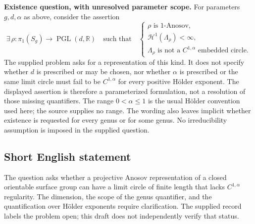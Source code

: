 \documentclass[11pt]{article}
\begin{document}
\textbf{Existence question, with unresolved parameter scope.} For parameters \(g,d,\alpha\) as above, consider the assertion
\[
\exists\,\rho:\pi_1(S_g)\to\operatorname{PGL}(d,\mathbb R)
\quad\text{such that}\quad
\begin{cases}
\rho\text{ is }1\text{-Anosov},\\
\mathcal H^1(\Lambda_\rho)<\infty,\\
\Lambda_\rho\text{ is not a }C^{1,\alpha}\text{ embedded circle}.
\end{cases}
\]
The supplied problem asks for a representation of this kind. It does not specify whether \(d\) is prescribed or may be chosen, nor whether \(\alpha\) is prescribed or the same limit circle must fail to be \(C^{1,\alpha}\) for every positive Hölder exponent. The displayed assertion is therefore a parameterized formulation, not a resolution of those missing quantifiers. The range \(0<\alpha\leq1\) is the usual Hölder convention used here; the source supplies no range. The wording also leaves implicit whether existence is requested for every genus or for some genus. No irreducibility assumption is imposed in the supplied question.
\subsection{Short English statement}
The question asks whether a projective Anosov representation of a closed orientable surface group can have a limit circle of finite length that lacks \(C^{1,\alpha}\) regularity. The dimension, the scope of the genus quantifier, and the quantification over Hölder exponents require clarification. The supplied record labels the problem open; this draft does not independently verify that status.
\end{document}
